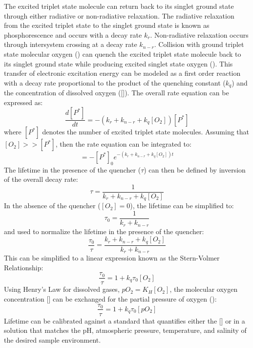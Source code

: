 The excited triplet state molecule can return back to its singlet ground state through either radiative or non-radiative relaxation. The radiative relaxation from the excited triplet state to the singlet ground state is known as phosphorescence and occurs with a decay rate $k_{r}$. Non-radiative relaxation occurs through intersystem crossing at a decay rate $k_{n-r}$. Collision with ground triplet state molecular oxygen () can quench the excited triplet state molecule back to its singlet ground state while producing excited singlet state oxygen (). This transfer of electronic excitation energy can be modeled as a first order reaction with a decay rate proportional to the product of the quenching constant ($k_{q}$) and the concentration of dissolved oxygen ([]).
%
The overall rate equation can be expressed as:
%
\begin{equation}
    \frac{d[P^*]}{dt} = -(k_{r} + k_{n-r} + k_{q}[O_{2}])[P^{*}]
\end{equation}
%
where $[P^{*}]$ denotes the number of excited triplet state molecules. Assuming that $[O_{2}] >> [P^{*}]$, then the rate equation can be integrated to:
%
\begin{equation}
    [P^*] = -[P^{*}]_{0}e^{-(k_{r} + k_{n-r} + k_{q}[O_{2}])t}
\end{equation}
%
The lifetime in the presence of the quencher ($\tau$) can then be defined by inversion of the overall decay rate:
%
\begin{equation}
    \tau = \frac{1}{k_{r} + k_{n-r} + k_{q}[O_{2}]}
\end{equation}
%
In the absence of the quencher ($[O_2] = 0$), the lifetime can be simplified to:
%
\begin{equation}
    \tau_{0} = \frac{1}{k_{r} + k_{n-r}}
\end{equation}
%
and used to normalize the lifetime in the presence of the quencher:
%
\begin{equation}
    \frac{\tau_{0}}{\tau} = \frac{k_{r} + k_{n-r} + k_{q}[O_{2}]}{k_{r} + k_{n-r}}
\end{equation}
%
This can be simplified to a linear expression known as the Stern-Volmer Relationship:
%
\begin{equation}
    \frac{\tau_{0}}{\tau} = 1 + k_{q}\tau_{0}[O_{2}]
\end{equation}
%
Using Henry's Law for dissolved gases, $pO_2 = K_H[O_2]$, the molecular oxygen concentration [] can be exchanged for the partial pressure of oxygen ():
%
\begin{equation}
    \frac{\tau_{0}}{\tau} = 1 + k_{q}\tau_{0}[pO_{2}]
\end{equation}
%
Lifetime can be calibrated against a standard that quantifies either the [] or  in a solution that matches the pH, atmospheric pressure, temperature, and salinity of the desired sample environment.
